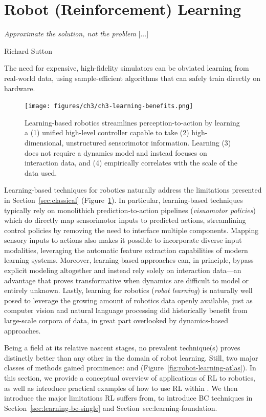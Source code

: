\section{Robot (Reinforcement) Learning}
\label{sec:learning-rl}

\epigraph{\textit{Approximate the solution, not the problem} [...]}{Richard Sutton}

\begin{tldr}
The need for expensive, high-fidelity simulators can be obviated learning from real-world data, using sample-efficient algorithms that can safely train directly on hardware.
\end{tldr}

\begin{figure}
    \centering
    \texttt{[image: figures/ch3/ch3-learning-benefits.png]}
    \caption{Learning-based robotics streamlines perception-to-action by learning a (1) unified high-level controller capable to take (2) high-dimensional, unstructured sensorimotor information. Learning (3) does not require a dynamics model and instead focuses on interaction data, and (4) empirically correlates with
    the scale of the data used.
    }
    \label{fig:robot-learning-upsides}
\end{figure}

Learning-based techniques for robotics naturally address the limitations presented in Section~\ref{sec:classical} (Figure~\ref{fig:robot-learning-upsides}).
In particular, learning-based techniques typically rely on monolithich prediction-to-action pipelines (\emph{visuomotor policies}) which do directly map sensorimotor inputs to predicted actions, streamlining control policies by removing the need to interface multiple components.
Mapping sensory inputs to actions also makes it possible to incorporate diverse input modalities, leveraging the automatic feature extraction capabilities of modern learning systems. 
Moreover, learning-based approaches can, in principle, bypass explicit modeling altogether and instead rely solely on interaction data---an advantage that proves transformative when dynamics are difficult to model or entirely unknown.
Lastly, learning for robotics (\emph{robot learning}) is naturally well posed to leverage the growing amount of robotics data openly available, just as computer vision and natural language processing did historically benefit from large-scale corpora of data, in great part overlooked by dynamics-based approaches.

Being a field at its relative nascent stages, no prevalent technique(s) proves distinctly better than any other in the domain of robot learning.
Still, two major classes of methods gained prominence:  and  (Figure~\ref{fig:robot-learning-atlas}).
In this section, we provide a conceptual overview of applications of RL to robotics, as well as introduce practical examples of how to use RL within \lerobot.
We then introduce the major limitations RL suffers from, to introduce BC techniques in Section~\ref{sec:learning-bc-single} and Section~{sec:learning-foundation}.

